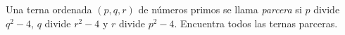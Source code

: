 Una terna ordenada $(p, q, r)$ de números primos se llama \textit{parcera} si $p$ divide $q^2-4$, $q$ divide $r^2-4$ y $r$ divide $p^2-4$. Encuentra todos las ternas parceras.
